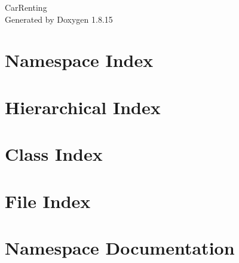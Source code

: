 \let\mypdfximage\pdfximage\def\pdfximage{\immediate\mypdfximage}\documentclass[twoside]{book}
\newcommand{\+}{\discretionary{\mbox{\scriptsize$\hookleftarrow$}}{}{}}
\newcommand{\clearemptydoublepage}{%
  \newpage{\pagestyle{empty}\cleardoublepage}%
}
\begin{document}
\hypersetup{pageanchor=false,
             bookmarksnumbered=true,
             pdfencoding=unicode
            }
\begin{titlepage}
\vspace*{7cm}
\begin{center}%
{\Large Car\+Renting }\\
\vspace*{1cm}
{\large Generated by Doxygen 1.8.15}\\
\end{center}
\end{titlepage}
\clearemptydoublepage
{}
\tableofcontents
\clearemptydoublepage
{}
\hypersetup{pageanchor=true}

\chapter{Namespace Index}

\chapter{Hierarchical Index}

\chapter{Class Index}

\chapter{File Index}

\chapter{Namespace Documentation}









\end{document}
